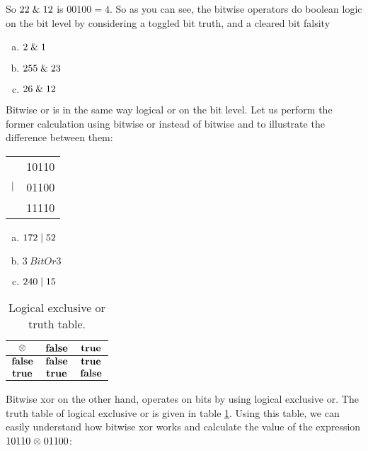 So $22 \mathrel{\&} 12$ is $00100=4$. So as you can see, the bitwise
operators do boolean logic on the bit level by considering a toggled
bit truth, and a cleared bit falsity

\begin{Exercise}[label={bitand}]
  \begin{enumerate}[(a)]
  \item $2 \mathrel{\&} 1$
  \item $255 \mathrel{\&} 23$
  \item $26 \mathrel{\&} 12$
  \end{enumerate}
\end{Exercise}

Bitwise or is in the same way logical or on the bit level. Let us
perform the former calculation using bitwise or instead of bitwise and
to illustrate the difference between them:

\begin{center}
  \begin{tabular}{lr}
             & 10110  \\
    $\mathrel{|}$ & 01100 \\
    \hline
    & 11110 \\
  \end{tabular}
\end{center}

\begin{Exercise}[label={bitor}]
  \begin{enumerate}[(a)]
  \item $172 \mathrel{|} 52$
  \item $3 \ BitOr 3$
  \item $240 \mathrel{|} 15$
  \end{enumerate}
\end{Exercise}

\begin{table}
  \centering
  \begin{tabular}{|c|c|c|}
    \hline
    $\mathbf{\mathrel{\otimes}}$ & $\mathbf{\textbf{false}}$ & $\mathbf{\textbf{true}}$ \\ \hline
    $\mathbf{\textbf{false}}$ & $\mathbf{\textbf{false}}$ & $\mathbf{\textbf{true}}$ \\ \hline
    $\mathbf{\textbf{true}}$ & $\mathbf{\textbf{true}}$ & $\mathbf{\textbf{false}}$ \\ \hline
  \end{tabular}
  \caption{Logical exclusive or truth table.}
  \label{tab:log-exlusive-or-table}
\end{table}

Bitwise xor on the other hand, operates on bits by using logical
exclusive or. The truth table of logical exclusive or is given in
table \ref{tab:log-exlusive-or-table}. Using this table, we can easily
understand how bitwise xor works and calculate the value of the
expression $10110 \mathrel{\otimes} 01100$:

